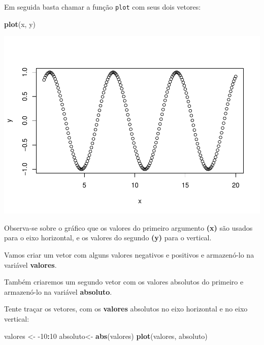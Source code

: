 \documentclass[
]{book}
\newenvironment{Shaded}{\begin{snugshade}}{\end{snugshade}}
\newcommand{\DecValTok}[1]{\textcolor[rgb]{0.00,0.00,0.81}{#1}}
\newcommand{\KeywordTok}[1]{\textcolor[rgb]{0.13,0.29,0.53}{\textbf{#1}}}
\newcommand{\NormalTok}[1]{#1}
\newcommand{\OperatorTok}[1]{\textcolor[rgb]{0.81,0.36,0.00}{\textbf{#1}}}
\newcommand{\StringTok}[1]{\textcolor[rgb]{0.31,0.60,0.02}{#1}}
\begin{document}
Em seguida basta chamar a função \texttt{plot} com seus dois vetores:

\begin{Shaded}
\begin{Highlighting}[]
\KeywordTok{plot}\NormalTok{(x, y)}
\end{Highlighting}
\end{Shaded}

\includegraphics{TudodoR_files/figure-latex/unnamed-chunk-46-1.pdf}

Observa-se sobre o gráfico que os valores do primeiro argumento \textbf{(x)} são usados para o eixo horizontal, e os valores do segundo \textbf{(y)} para o vertical.

Vamos criar um vetor com alguns valores negativos e positivos e armazenó-lo na variável \textbf{valores}.

Também criaremos um segundo vetor com os valores absolutos do primeiro e armazenó-lo na variável \textbf{absoluto}.

Tente traçar os vetores, com os \textbf{valores} absolutos no eixo horizontal e no eixo vertical:

\begin{Shaded}
\begin{Highlighting}[]
\NormalTok{valores <-}\StringTok{ }\DecValTok{-10}\OperatorTok{:}\DecValTok{10}
\NormalTok{absoluto<-}\StringTok{ }\KeywordTok{abs}\NormalTok{(valores)}
\KeywordTok{plot}\NormalTok{(valores, absoluto)}
\end{Highlighting}
\end{Shaded}
\end{document}
